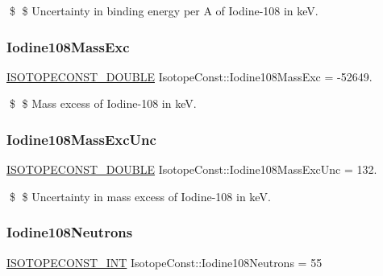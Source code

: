 \$ \$ Uncertainty in binding energy per A of Iodine-\/108 in keV. \mbox{\label{group___isotope_const-_iodine-_i108_ga6767e2dcb61493353d3f228f516c2fe3}} 
\subsubsection{\texorpdfstring{Iodine108\+Mass\+Exc}{Iodine108MassExc}}
{\footnotesize\ttfamily \mbox{\hyperlink{group___isotope_const-_macros_ga8f45a7272ce02c0b4c65c44636ed719a}{I\+S\+O\+T\+O\+P\+E\+C\+O\+N\+S\+T\+\_\+\+D\+O\+U\+B\+LE}} Isotope\+Const\+::\+Iodine108\+Mass\+Exc = -\/52649.}

\$ \$ Mass excess of Iodine-\/108 in keV. \mbox{\label{group___isotope_const-_iodine-_i108_gac858fb55398957787b6dc87db4b8c6f5}} 
\subsubsection{\texorpdfstring{Iodine108\+Mass\+Exc\+Unc}{Iodine108MassExcUnc}}
{\footnotesize\ttfamily \mbox{\hyperlink{group___isotope_const-_macros_ga8f45a7272ce02c0b4c65c44636ed719a}{I\+S\+O\+T\+O\+P\+E\+C\+O\+N\+S\+T\+\_\+\+D\+O\+U\+B\+LE}} Isotope\+Const\+::\+Iodine108\+Mass\+Exc\+Unc = 132.}

\$ \$ Uncertainty in mass excess of Iodine-\/108 in keV. \mbox{\label{group___isotope_const-_iodine-_i108_ga9e90612aa53efbd6864c16ab8792ad8d}} 
\subsubsection{\texorpdfstring{Iodine108\+Neutrons}{Iodine108Neutrons}}
{\footnotesize\ttfamily \mbox{\hyperlink{group___isotope_const-_macros_ga5f18360b3e99483a35c32d789e62621c}{I\+S\+O\+T\+O\+P\+E\+C\+O\+N\+S\+T\+\_\+\+I\+NT}} Isotope\+Const\+::\+Iodine108\+Neutrons = 55}

